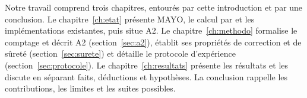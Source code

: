 Notre travail comprend trois chapitres, entourés par cette introduction et par une conclusion. Le chapitre~\ref{ch:etat} présente MAYO, le calcul par \vpshufb{} et les implémentations existantes, puis situe A2. Le chapitre~\ref{ch:methodo} formalise le comptage et décrit A2 (section~\ref{sec:a2}), établit ses propriétés de correction et de sûreté (section~\ref{sec:surete}) et détaille le protocole d'expérience (section~\ref{sec:protocole}). Le chapitre~\ref{ch:resultats} présente les résultats et les discute en séparant faits, déductions et hypothèses. La conclusion rappelle les contributions, les limites et les suites possibles.

